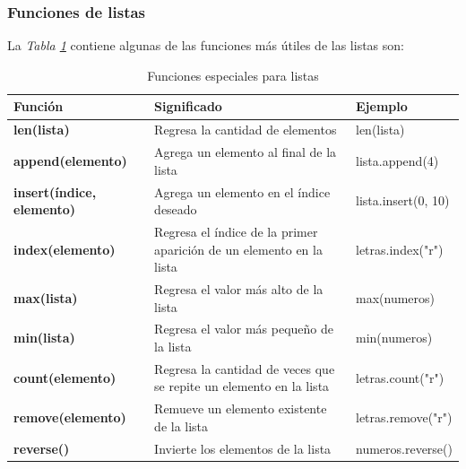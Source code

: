\subsubsection{Funciones de listas}
\hspace{0.55cm}La \textit{Tabla \ref{tab: 8}} contiene algunas de las funciones más útiles de las listas son:
\begin{table}[H]
    \begin{center}
        \caption{Funciones especiales para listas}
        \label{tab: 8}
        \begin{tabular}{m{4cm}|m{5cm}|m{3cm}}
            \hline
            \textbf{Función}&\textbf{Significado}&\textbf{Ejemplo} \\
            \hline
            \textbf{len(lista)}					& Regresa la cantidad de elementos										& len(lista) \\
            \textbf{append(elemento)}			& Agrega un elemento al final de la lista								& lista.append(4) \\
            \textbf{insert(índice, elemento)}	& Agrega un elemento en el índice deseado 								& lista.insert(0, 10) \\
            \textbf{index(elemento)}				& Regresa el índice de la primer aparición de un elemento en la lista		& letras.index("r") \\
            \textbf{max(lista)}					& Regresa el valor más alto de la lista									& max(numeros) \\
            \textbf{min(lista)}					& Regresa el valor más pequeño de la lista								& min(numeros) \\
            \textbf{count(elemento)}				& Regresa la cantidad de veces que se repite un elemento en la lista		& letras.count("r") \\
            \textbf{remove(elemento)}			& Remueve un elemento existente de la lista								& letras.remove("r") \\
            \textbf{reverse()}					& Invierte los elementos de la lista										& numeros.reverse() \\
            \hline
        \end{tabular}
    \end{center}    
\end{table}


